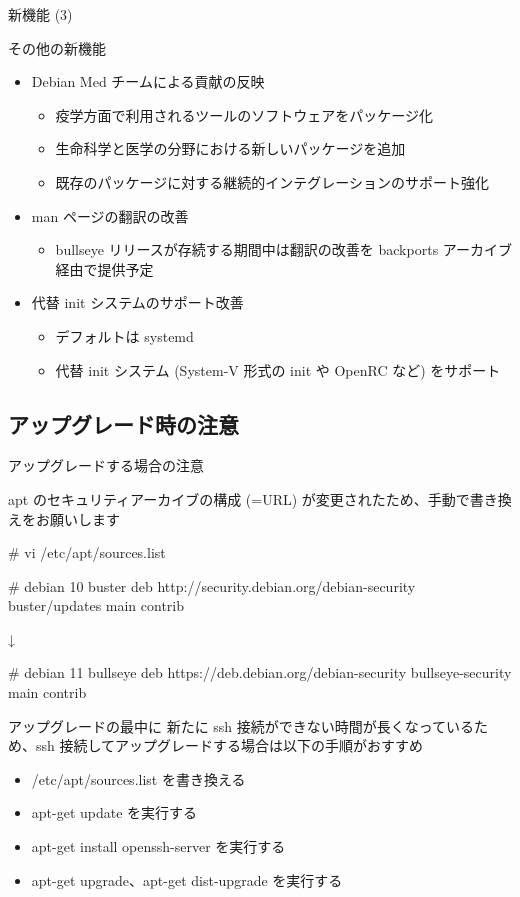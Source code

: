 \begin{frame}{新機能 (3)}

その他の新機能
  
\begin{itemize}
\item Debian Med チームによる貢献の反映
  \begin{itemize}
  \item 疫学方面で利用されるツールのソフトウェアをパッケージ化
  \item 生命科学と医学の分野における新しいパッケージを追加
  \item 既存のパッケージに対する継続的インテグレーションのサポート強化
  \end{itemize}
\item man ページの翻訳の改善
  \begin{itemize}
  \item bullseye リリースが存続する期間中は翻訳の改善を backports アーカイブ経由で提供予定
  \end{itemize}
\item 代替 init システムのサポート改善
  \begin{itemize}
  \item デフォルトは systemd
  \item 代替 init システム (System-V 形式の init や OpenRC など) をサポート
  \end{itemize}
\end{itemize}

\end{frame}


\subsection{アップグレード時の注意}

\begin{frame}[containsverbatim]{アップグレードする場合の注意}

apt のセキュリティアーカイブの構成 (=URL) が変更されたため、手動で書き換えをお願いします

\begin{commandlinesmall}
# vi /etc/apt/sources.list
  
# debian 10 buster
deb http://security.debian.org/debian-security buster/updates main contrib

↓

# debian 11 bullseye
deb https://deb.debian.org/debian-security bullseye-security main contrib
\end{commandlinesmall}

アップグレードの最中に 新たに ssh 接続ができない時間が長くなっているため、ssh 接続してアップグレードする場合は以下の手順がおすすめ

\begin{itemize}
\item /etc/apt/sources.list を書き換える
\item apt-get update を実行する
\item apt-get install openssh-server を実行する
\item apt-get upgrade、apt-get dist-upgrade を実行する
\end{itemize}

\end{frame}


